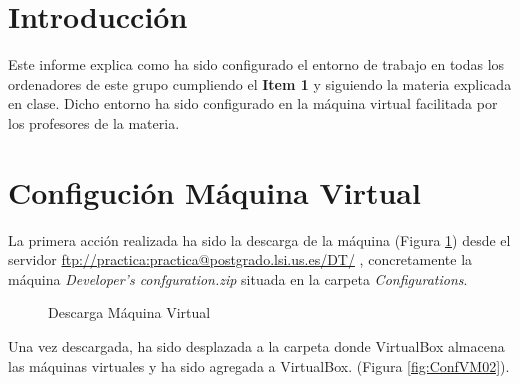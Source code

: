 \documentclass{scrartcl}
\begin{document}




\section{Introducción}
Este informe explica como ha sido configurado el entorno de trabajo en todas los ordenadores de este grupo cumpliendo el \textbf{Item 1} y siguiendo la materia explicada en clase. Dicho entorno ha sido configurado en la máquina virtual facilitada por los profesores de la materia.
\section{Configución Máquina Virtual}
La primera acción realizada ha sido la descarga de la máquina  (Figura \ref{fig:ConfVM01}) desde el servidor \href{ftp://practica:practica@postgrado.lsi.us.es/DT/}{ftp://practica:practica@postgrado.lsi.us.es/DT/} , concretamente la máquina \textit{Developer's confguration.zip}  situada en la carpeta  \textit{Configurations}.

\begin{figure}[H]
	
	\centering
	\caption{Descarga Máquina Virtual}
	\label{fig:ConfVM01}
	
\end{figure}

Una vez descargada, ha sido desplazada a la carpeta donde VirtualBox almacena las máquinas virtuales y ha sido agregada a VirtualBox. (Figura \ref{fig:ConfVM02}).
\end{document}
